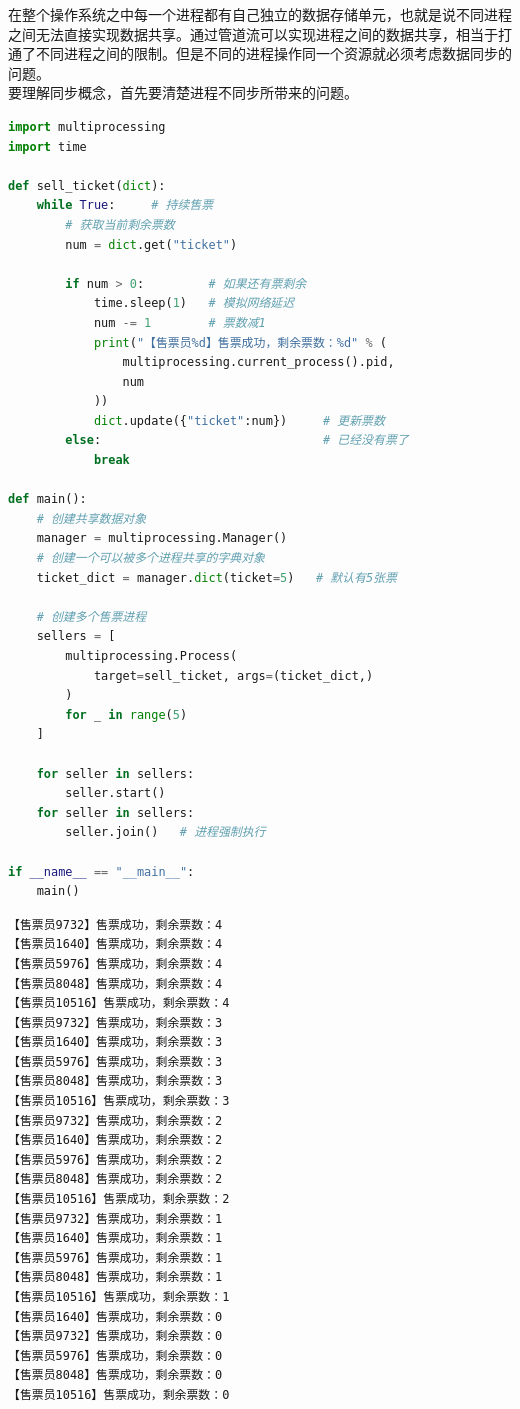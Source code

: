 在整个操作系统之中每一个进程都有自己独立的数据存储单元，也就是说不同进程之间无法直接实现数据共享。通过管道流可以实现进程之间的数据共享，相当于打通了不同进程之间的限制。但是不同的进程操作同一个资源就必须考虑数据同步的问题。\\

要理解同步概念，首先要清楚进程不同步所带来的问题。\\


\begin{lstlisting}[language=Python]
import multiprocessing
import time

def sell_ticket(dict):
	while True:     # 持续售票
		# 获取当前剩余票数
		num = dict.get("ticket")
		
		if num > 0:         # 如果还有票剩余
			time.sleep(1)   # 模拟网络延迟
			num -= 1        # 票数减1
			print("【售票员%d】售票成功，剩余票数：%d" % (
				multiprocessing.current_process().pid,
				num
			))
			dict.update({"ticket":num})     # 更新票数
		else:                				# 已经没有票了
			break

def main():
	# 创建共享数据对象
	manager = multiprocessing.Manager()
	# 创建一个可以被多个进程共享的字典对象
	ticket_dict = manager.dict(ticket=5)   # 默认有5张票

	# 创建多个售票进程
	sellers = [
		multiprocessing.Process(
			target=sell_ticket, args=(ticket_dict,)
		) 
		for _ in range(5)
	]

	for seller in sellers:
		seller.start()
	for seller in sellers:
		seller.join()   # 进程强制执行

if __name__ == "__main__":
	main()
\end{lstlisting}

\begin{tcolorbox}
	\begin{verbatim}
【售票员9732】售票成功，剩余票数：4
【售票员1640】售票成功，剩余票数：4
【售票员5976】售票成功，剩余票数：4
【售票员8048】售票成功，剩余票数：4
【售票员10516】售票成功，剩余票数：4
【售票员9732】售票成功，剩余票数：3
【售票员1640】售票成功，剩余票数：3
【售票员5976】售票成功，剩余票数：3
【售票员8048】售票成功，剩余票数：3
【售票员10516】售票成功，剩余票数：3
【售票员9732】售票成功，剩余票数：2
【售票员1640】售票成功，剩余票数：2
【售票员5976】售票成功，剩余票数：2
【售票员8048】售票成功，剩余票数：2
【售票员10516】售票成功，剩余票数：2
【售票员9732】售票成功，剩余票数：1
【售票员1640】售票成功，剩余票数：1
【售票员5976】售票成功，剩余票数：1
【售票员8048】售票成功，剩余票数：1
【售票员10516】售票成功，剩余票数：1
【售票员1640】售票成功，剩余票数：0
【售票员9732】售票成功，剩余票数：0
【售票员5976】售票成功，剩余票数：0
【售票员8048】售票成功，剩余票数：0
【售票员10516】售票成功，剩余票数：0
\end{verbatim}
\end{tcolorbox}

